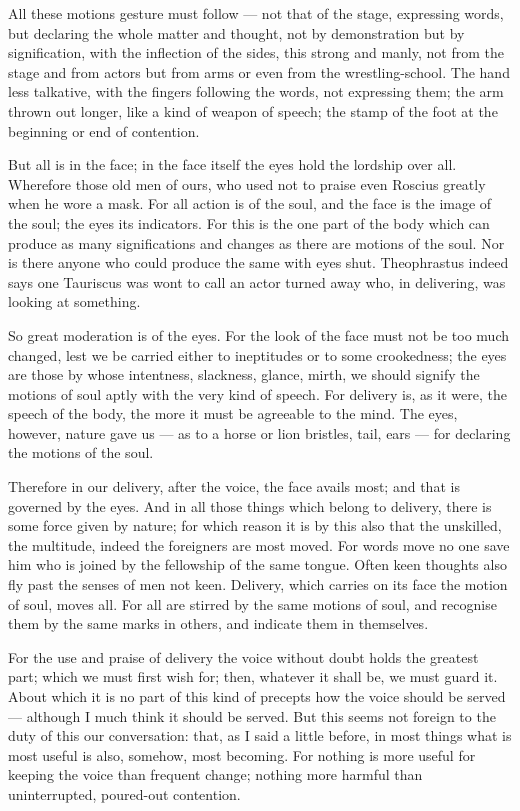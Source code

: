  All these motions gesture must follow — not that of the stage, expressing words, but declaring the whole matter and thought, not by demonstration but by signification, with the inflection of the sides, this strong and manly, not from the stage and from actors but from arms or even from the wrestling-school. The hand less talkative, with the fingers following the words, not expressing them; the arm thrown out longer, like a kind of weapon of speech; the stamp of the foot at the beginning or end of contention.

 But all is in the face; in the face itself the eyes hold the lordship over all. Wherefore those old men of ours, who used not to praise even Roscius greatly when he wore a mask. For all action is of the soul, and the face is the image of the soul; the eyes its indicators. For this is the one part of the body which can produce as many significations and changes as there are motions of the soul. Nor is there anyone who could produce the same with eyes shut. Theophrastus indeed says one Tauriscus was wont to call an actor turned away who, in delivering, was looking at something.

 So great moderation is of the eyes. For the look of the face must not be too much changed, lest we be carried either to ineptitudes or to some crookedness; the eyes are those by whose intentness, slackness, glance, mirth, we should signify the motions of soul aptly with the very kind of speech. For delivery is, as it were, the speech of the body, the more it must be agreeable to the mind. The eyes, however, nature gave us — as to a horse or lion bristles, tail, ears — for declaring the motions of the soul.

 Therefore in our delivery, after the voice, the face avails most; and that is governed by the eyes. And in all those things which belong to delivery, there is some force given by nature; for which reason it is by this also that the unskilled, the multitude, indeed the foreigners are most moved. For words move no one save him who is joined by the fellowship of the same tongue. Often keen thoughts also fly past the senses of men not keen. Delivery, which carries on its face the motion of soul, moves all. For all are stirred by the same motions of soul, and recognise them by the same marks in others, and indicate them in themselves.

 For the use and praise of delivery the voice without doubt holds the greatest part; which we must first wish for; then, whatever it shall be, we must guard it. About which it is no part of this kind of precepts how the voice should be served — although I much think it should be served. But this seems not foreign to the duty of this our conversation: that, as I said a little before, in most things what is most useful is also, somehow, most becoming. For nothing is more useful for keeping the voice than frequent change; nothing more harmful than uninterrupted, poured-out contention.


